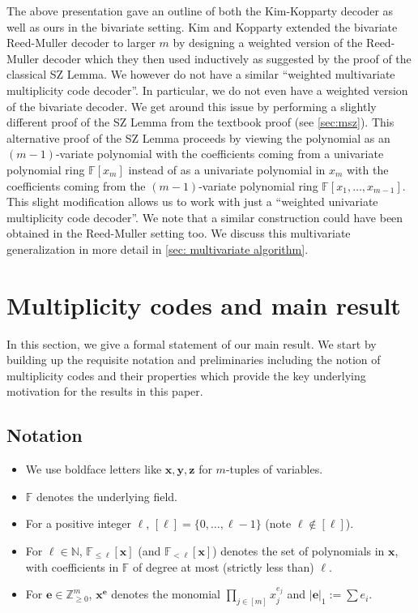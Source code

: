 \documentclass{article}
\def\Integer{\mathbb{Z}}
\def\Natural{\mathbb{N}}
\def\Field{\mathbb{F}}
\let\N\Natural
\let\Z\Integer
\let\F\Field
\def\vece{\mathbf{e}}
\def\vecx{\mathbf{x}}
\def\vecy{\mathbf{y}}
\def\vecz{\mathbf{z}}
\newcommand{\vy}{\vecy}
\newcommand{\vz}{\vecz}
\newcommand{\vx}{\vecx}
\newcommand{\ve}{\vece}
\begin{document}
	The above presentation gave an outline of both the Kim-Kopparty
	decoder as well as ours in the bivariate setting. Kim and Kopparty
	extended the bivariate Reed-Muller decoder to larger $m$ by designing
	a weighted version of the Reed-Muller decoder which they then used
	inductively as suggested by the proof of the classical SZ Lemma. We
	however do not have a similar ``weighted multivariate multiplicity
	code decoder''. In particular, we do not even have a weighted version of
	the bivariate decoder. We get around this issue by performing a
	slightly different proof of the SZ Lemma from the textbook proof (see \cref{sec:msz}). This
	alternative proof of the SZ Lemma proceeds by viewing the
	polynomial as an $(m-1)$-variate polynomial with the coefficients
	coming from a univariate polynomial ring $\F[x_m]$ instead of as a
	univariate polynomial in $x_m$ with the coefficients coming from the
	$(m-1)$-variate polynomial ring $\F[x_1, \ldots, x_{m-1}]$. This
	slight modification allows us to work with just a ``weighted
	univariate multiplicity code decoder''. We note that a similar
	construction could have been obtained in the Reed-Muller setting too. We discuss this multivariate generalization in more detail in \cref{sec: multivariate algorithm}. 
	
	
	\section{Multiplicity codes and main result} \label{sec: mult prelims}
	In this section, we give a formal statement of our main result. We start by building up the requisite notation and preliminaries including the notion of multiplicity codes and their properties which provide the key underlying motivation for the results in this paper.  
	
	\subsection{Notation}
	
	\begin{itemize}
		\item We use boldface letters like $\vx, \vy, \vz$ for $m$-tuples of
		variables. 
		\item $\F$ denotes the underlying field. 
		\item For a positive integer $\ell$, $[\ell] = \{0, \ldots, \ell -
		1\}$ (note $\ell \notin [\ell]$). 
		\item For $\ell \in \N$, $\F_{\leq \ell}[\vx]$ (and $\F_{<\ell}[\vx]$)
		denotes the set of
		polynomials in $\vx$, with coefficients in $\F$ of degree at most
		(strictly less than)
		$\ell$. 
		\item For $\ve \in \Z_{\geq 0}^m$, $\vx^{\ve}$ denotes the monomial
		$\prod_{j\in [m]} x_j^{e_j}$ and $|\ve|_1 := \sum e_i$.
	\end{itemize}
	
\end{document}
